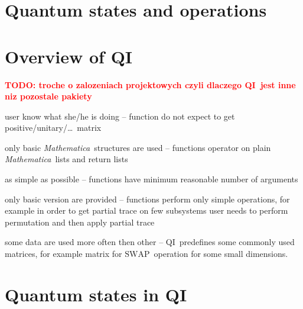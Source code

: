 \documentclass[final,5p,times,twocolumn]{elsarticle}
\newcommand{\Mathematica}{\emph{Mathematica}}
\newcommand{\1}{{\rm 1\hspace{-0.9mm}l}}
\newcommand{\SWAP}{\ensuremath{\mathrm{SWAP}}}
\newcommand{\qi}{QI}
\newcommand{\todo}[1]{\textcolor{red}{\bf TODO: #1}}
\begin{document}

\section{Quantum states and operations}\label{sec:qi-intro}



\section{Overview of \qi}\label{sec:over}
\todo{troche o zalozeniach projektowych czyli dlaczego \qi\ jest inne niz pozostale pakiety}
\begin{list}{(P)}{}
\item user know what she/he is doing -- function do not expect to get
positive/unitary/\ldots\ matrix 
\item only basic \Mathematica\ structures are
used -- functions operator on plain \Mathematica\ lists and return lists 
\item as simple as possible -- functions have minimum reasonable number of
arguments
\item only basic version are provided -- functions perform only simple
operations, for example in order to get partial trace on few subsystems user
needs to perform permutation and then apply partial trace 
\item some data are
used more often then other -- \qi\ predefines some commonly used matrices, for
example matrix for \SWAP\ operation for some small dimensions.
\end{list}


\section{Quantum states in \qi}\label{sec:states}

\end{document}
